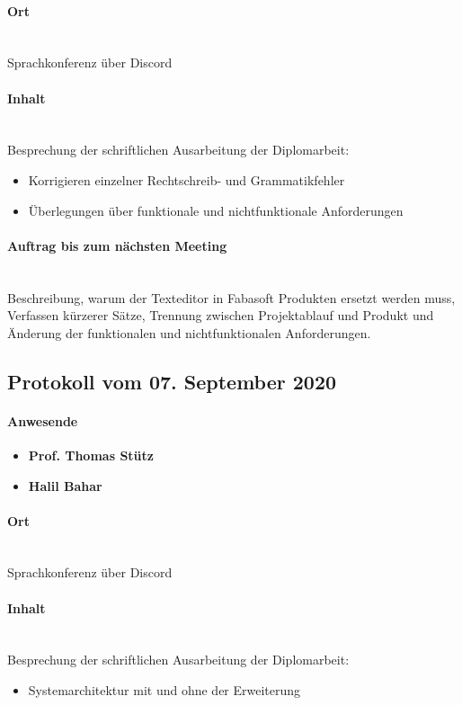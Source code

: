 \paragraph{Ort}\mbox{}\\
Sprachkonferenz über Discord

\paragraph{Inhalt}\mbox{}\\
Besprechung der schriftlichen Ausarbeitung der Diplomarbeit:
\begin{itemize}
	\item{Korrigieren einzelner Rechtschreib- und Grammatikfehler}
	\item{Überlegungen über funktionale und nichtfunktionale Anforderungen}
\end{itemize}

\paragraph{Auftrag bis zum nächsten Meeting}\mbox{}\\
Beschreibung, warum der Texteditor in Fabasoft Produkten ersetzt werden muss, Verfassen kürzerer Sätze, Trennung zwischen Projektablauf und Produkt und Änderung der funktionalen und nichtfunktionalen Anforderungen.

\subsection{Protokoll vom 07. September 2020}

\paragraph{Anwesende}
\begin{itemize}
	\item{\textbf{Prof. Thomas Stütz}}
	\item{\textbf{Halil Bahar}}
\end{itemize}

\paragraph{Ort}\mbox{}\\
Sprachkonferenz über Discord

\paragraph{Inhalt}\mbox{}\\
Besprechung der schriftlichen Ausarbeitung der Diplomarbeit:
\begin{itemize}
	\item{Systemarchitektur mit und ohne der Erweiterung}
\end{itemize}


